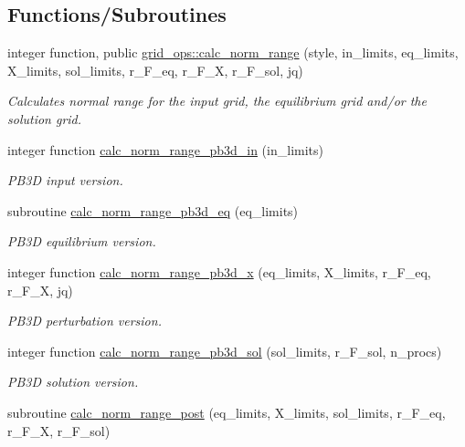 \subsection*{Functions/\+Subroutines}
\begin{DoxyCompactItemize}
\item 
integer function, public \hyperlink{namespacegrid__ops_a1c18f90f93f5fce7ebb4dba60b70e0f8}{grid\+\_\+ops\+::calc\+\_\+norm\+\_\+range} (style, in\+\_\+limits, eq\+\_\+limits, X\+\_\+limits, sol\+\_\+limits, r\+\_\+\+F\+\_\+eq, r\+\_\+\+F\+\_\+X, r\+\_\+\+F\+\_\+sol, jq)
\begin{DoxyCompactList}\small\item\em Calculates normal range for the input grid, the equilibrium grid and/or the solution grid. \end{DoxyCompactList}\item 
integer function \hyperlink{grid__ops_8f90_aebe21d718069318bced62bc3d2d09393}{calc\+\_\+norm\+\_\+range\+\_\+pb3d\+\_\+in} (in\+\_\+limits)
\begin{DoxyCompactList}\small\item\em P\+B3D input version. \end{DoxyCompactList}\item 
subroutine \hyperlink{grid__ops_8f90_a868669b6df6c0fa6a8cedd993042f6ea}{calc\+\_\+norm\+\_\+range\+\_\+pb3d\+\_\+eq} (eq\+\_\+limits)
\begin{DoxyCompactList}\small\item\em P\+B3D equilibrium version. \end{DoxyCompactList}\item 
integer function \hyperlink{grid__ops_8f90_a0bd0af6203161233f7687c029d6c4ca0}{calc\+\_\+norm\+\_\+range\+\_\+pb3d\+\_\+x} (eq\+\_\+limits, X\+\_\+limits, r\+\_\+\+F\+\_\+eq, r\+\_\+\+F\+\_\+X, jq)
\begin{DoxyCompactList}\small\item\em P\+B3D perturbation version. \end{DoxyCompactList}\item 
integer function \hyperlink{grid__ops_8f90_a9121423739548f1a1fa4e87055f49010}{calc\+\_\+norm\+\_\+range\+\_\+pb3d\+\_\+sol} (sol\+\_\+limits, r\+\_\+\+F\+\_\+sol, n\+\_\+procs)
\begin{DoxyCompactList}\small\item\em P\+B3D solution version. \end{DoxyCompactList}\item 
subroutine \hyperlink{grid__ops_8f90_aa3b47be0188da6dd19a745f796c1500f}{calc\+\_\+norm\+\_\+range\+\_\+post} (eq\+\_\+limits, X\+\_\+limits, sol\+\_\+limits, r\+\_\+\+F\+\_\+eq, r\+\_\+\+F\+\_\+X, r\+\_\+\+F\+\_\+sol)

\end{DoxyCompactItemize}
